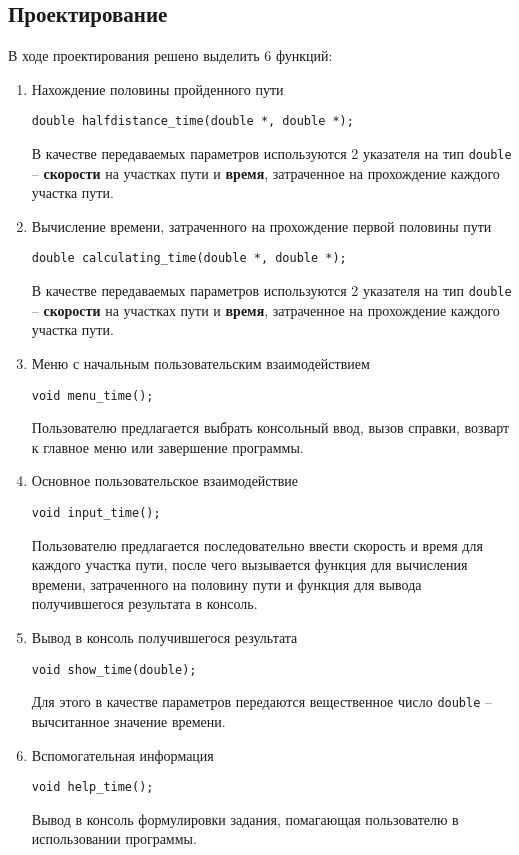 \documentclass[12pt,a4paper]{report}
\begin{document}
\subsection{Проектирование}
\hspace{\parindent}В ходе проектирования решено выделить 6 функций:
\begin{enumerate}
	\item Нахождение половины пройденного пути
	
	\verb+double halfdistance_time(double *, double *);+
	
	В качестве передаваемых параметров используются 2 указателя на тип \texttt{double} -- \textbf{скорости}  на участках пути и \textbf{время}, затраченное на прохождение каждого участка пути.
		 
	\item Вычисление времени, затраченного на прохождение первой половины пути
	
	\verb+double calculating_time(double *, double *);+
	
	В качестве передаваемых параметров используются 2 указателя на тип \texttt{double} -- \textbf{скорости}  на участках пути и \textbf{время}, затраченное на прохождение каждого участка пути.	
		 
	\item Меню с начальным пользовательским взаимодействием
	
	\verb+void menu_time();+
	
	Пользователю предлагается выбрать консольный ввод, вызов справки, возварт к главное меню или завершение программы.
	
	\item Основное пользовательское взаимодействие
	
	\verb+void input_time();+
	
	Пользователю предлагается последовательно ввести скорость и время для каждого участка пути, после чего вызывается функция для вычисления времени, затраченного на половину пути и функция для вывода получившегося результата в консоль.
	
	\item Вывод в консоль получившегося результата
	
	\verb+void show_time(double);+
	
	Для этого в качестве параметров передаются вещественное число \texttt{double} -- вычситанное значение времени.

	\item Вспомогательная информация
	
	\verb+void help_time();+
	
	Вывод в консоль формулировки задания, помагающая пользователю в использовании программы.
\end{enumerate}
\end{document}
